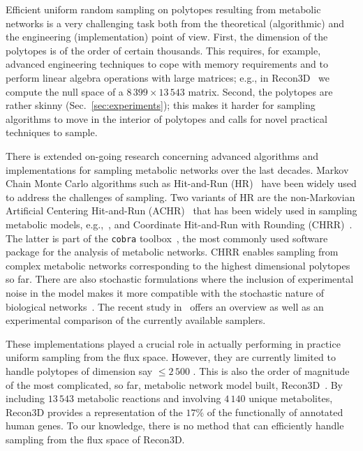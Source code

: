   Efficient uniform random sampling on polytopes resulting from metabolic
   networks is a very challenging task  both from the theoretical (algorithmic)
   and the engineering (implementation)  point of view.
   First, the dimension of the polytopes is of the order of certain thousands. This
   requires, for example, advanced engineering techniques to cope with memory
   requirements and to perform linear algebra operations with large matrices;
   e.g., in
   Recon3D~\cite{brunk2018recon3d} we compute the null space of a
   $8\,399 \times 13\,543$ matrix. Second, the polytopes are rather skinny
   (Sec.~\ref{sec:experiments}); this makes it harder for sampling algorithms to
   move in the interior of polytopes and calls for novel practical techniques to
   sample.

   There is extended on-going research concerning advanced algorithms and
   implementations for sampling metabolic networks over the last decades. Markov
   Chain Monte Carlo algorithms such as Hit-and-Run (HR)~\cite{smith84} have been
   widely used to address the challenges of sampling. Two variants of HR are the
   non-Markovian Artificial Centering Hit-and-Run
   (ACHR)~\cite{kaufman1998direction} that has been widely used in sampling
   metabolic models, e.g.,~\cite{Saa16}, and Coordinate Hit-and-Run with Rounding
   (CHRR)~\cite{haraldsdottir2017chrr}. 
   The latter is part of the \texttt{cobra} toolbox~\cite{heirendt2019creation}, the most commonly used software package for the analysis of metabolic networks. 
   CHRR enables sampling from complex metabolic
   networks corresponding to the highest dimensional polytopes so far. There are
   also stochastic formulations where the inclusion of experimental noise in the
   model makes it more compatible with the stochastic nature of biological
   networks~\cite{MacGillivray17}. The recent study in~\cite{fallahi2020comparison}
   offers an overview as well as an experimental comparison of the currently
   available samplers.

   These implementations played a crucial role in actually performing in practice
   uniform sampling from the flux space. However, they are currently limited to
   handle polytopes of dimension say $\leq 2\, 500$ \cite{fallahi2020comparison,
   haraldsdottir2017chrr}. This is also the order of magnitude of the most
   complicated, so far, metabolic network model built,
   Recon3D~\cite{brunk2018recon3d}. By including $13\,543$ metabolic reactions and
   involving $4 \,140$ unique metabolites, Recon3D provides a representation of the
   $17\%$ of the functionally of annotated human genes. To our knowledge, there is
   no method that can efficiently handle sampling from the flux space of Recon3D.

